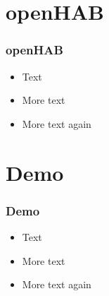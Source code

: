\section{openHAB}

\begin{frame} 
\frametitle{openHAB}
  \begin{itemize}
  \item Text
  \item More text
  \item More text again
  \end{itemize}
\end{frame}


\section{Demo}

\begin{frame} 
\frametitle{Demo}
  \begin{itemize}
  \item Text
  \item More text
  \item More text again
  \end{itemize}
\end{frame}


